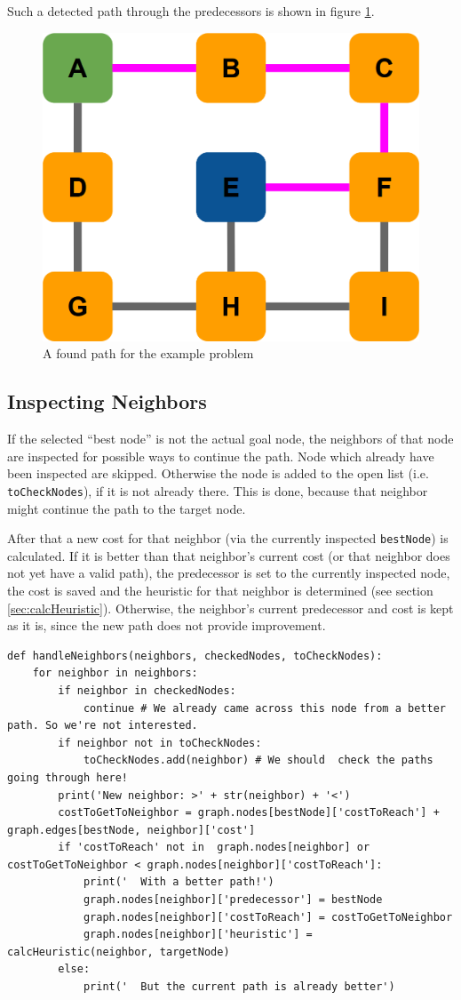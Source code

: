 \documentclass[12pt]{article}
\begin{document}
Such a detected path through the predecessors is shown in figure \ref{fig:path}.

\begin{figure}[H]
	\centering
	\includegraphics[width=0.7\linewidth]{sources/path}
	\caption{A found path for the example problem}
	\label{fig:path}
\end{figure}

\subsection{Inspecting Neighbors}
\label{sec:handleNeighbors}
If the selected \enquote{best node} is not the actual goal node, the neighbors of that node are inspected for possible ways to continue the path.
Node which already have been inspected are skipped.
Otherwise the node is added to the open list (i.e. \texttt{toCheckNodes}), if it is not already there. This is done, because that neighbor might continue the path to the target node.

After that a new cost for that neighbor (via the currently inspected \texttt{bestNode}) is calculated.
If it is better than that neighbor's current cost (or that neighbor does not yet have a valid path), the predecessor is set to the currently inspected node, the cost is saved and the heuristic for that neighbor is determined (see section \ref{sec:calcHeuristic}).
Otherwise, the neighbor's current predecessor and cost is kept as it is, since the new path does not provide improvement.
\begin{lstlisting}
def handleNeighbors(neighbors, checkedNodes, toCheckNodes):
	for neighbor in neighbors:
		if neighbor in checkedNodes:
			continue # We already came across this node from a better path. So we're not interested.
		if neighbor not in toCheckNodes:
			toCheckNodes.add(neighbor) # We should  check the paths going through here!
		print('New neighbor: >' + str(neighbor) + '<')
		costToGetToNeighbor = graph.nodes[bestNode]['costToReach'] + graph.edges[bestNode, neighbor]['cost']
		if 'costToReach' not in  graph.nodes[neighbor] or costToGetToNeighbor < graph.nodes[neighbor]['costToReach']:
			print('  With a better path!')
			graph.nodes[neighbor]['predecessor'] = bestNode
			graph.nodes[neighbor]['costToReach'] = costToGetToNeighbor
			graph.nodes[neighbor]['heuristic'] = calcHeuristic(neighbor, targetNode)
		else:
			print('  But the current path is already better')
\end{lstlisting}
	
\end{document}
